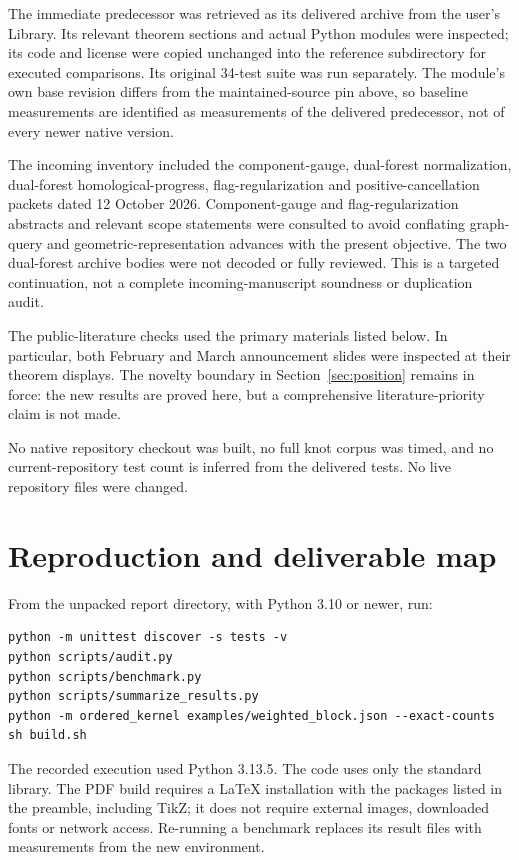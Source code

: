 \documentclass[11pt]{article}
\theoremstyle{definition}\newtheorem{definition}[theorem]{Definition}
\theoremstyle{remark}\newtheorem{remark}[theorem]{Remark}
\begin{document}
The immediate predecessor \cite{positive} was retrieved as its delivered archive from the user's Library. Its relevant theorem sections and actual Python modules were inspected; its code and license were copied unchanged into the reference subdirectory for executed comparisons. Its original 34-test suite was run separately. The module's own base revision differs from the maintained-source pin above, so baseline measurements are identified as measurements of the delivered predecessor, not of every newer native version.

The incoming inventory included the component-gauge, dual-forest normalization, dual-forest homological-progress, flag-regularization and positive-cancellation packets dated 12 October 2026. Component-gauge and flag-regularization abstracts and relevant scope statements were consulted to avoid conflating graph-query and geometric-representation advances with the present objective. The two dual-forest archive bodies were not decoded or fully reviewed. This is a targeted continuation, not a complete incoming-manuscript soundness or duplication audit.

The public-literature checks used the primary materials listed below. In particular, both February and March announcement slides were inspected at their theorem displays. The novelty boundary in Section~\ref{sec:position} remains in force: the new results are proved here, but a comprehensive literature-priority claim is not made.

No native repository checkout was built, no full knot corpus was timed, and no current-repository test count is inferred from the delivered tests. No live repository files were changed.

\section{Reproduction and deliverable map}
\label{app:repro}

From the unpacked report directory, with Python 3.10 or newer, run:
\begin{lstlisting}
python -m unittest discover -s tests -v
python scripts/audit.py
python scripts/benchmark.py
python scripts/summarize_results.py
python -m ordered_kernel examples/weighted_block.json --exact-counts
sh build.sh
\end{lstlisting}
The recorded execution used Python 3.13.5. The code uses only the standard library. The PDF build requires a LaTeX installation with the packages listed in the preamble, including TikZ; it does not require external images, downloaded fonts or network access. Re-running a benchmark replaces its result files with measurements from the new environment.
\end{document}
